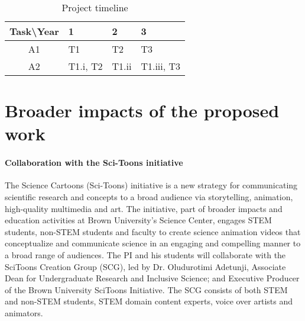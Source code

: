 \documentclass[10pt,letterpaper]{article}
\begin{document}


      \begin{table}[H]
        \center
        \caption{Project timeline}
        \label{t:timeline}
        \begin{tabular}{clll}
          \hline
          Task\textbackslash Year & 1 &  2 &  3 \\
          \hline
          A1 & T1 & T2 & T3 \\
          A2 & T1.i, T2 & T1.ii & T1.iii, T3 \\
          \hline
        \end{tabular}
      \end{table}

\section{Broader impacts of the proposed work}
  \label{s:broaderimp}
  \paragraph{Collaboration with the Sci-Toons initiative}
    The Science Cartoons (Sci-Toons) initiative is a new strategy for communicating scientific research and concepts to a broad audience via storytelling, animation, high-quality multimedia and art. The initiative, part of broader impacts and education activities at Brown University's Science Center, engages STEM students, non-STEM students and faculty to create science animation videos that conceptualize and communicate science in an engaging and compelling manner to a broad range of audiences. The PI and his students will collaborate with the SciToons Creation Group (SCG), led by Dr. Oludurotimi Adetunji, Associate Dean for Undergraduate Research and Inclusive Science; and Executive Producer of the Brown University SciToons Initiative. The SCG consists of both STEM and non-STEM students, STEM domain content experts, voice over artists and animators.
\end{document}
